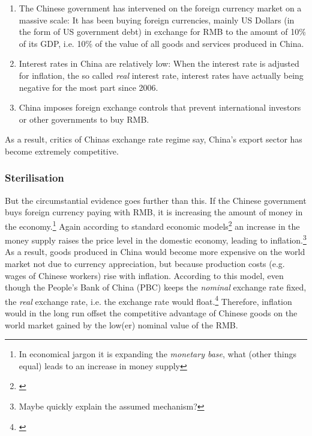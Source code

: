 \documentclass[11pt]{article}
\begin{document}
\begin{enumerate}
\item{The Chinese government has intervened on the foreign currency 
		market on a massive scale: It has been buying foreign 
		currencies, mainly US Dollars (in the form of US government 
		debt) in exchange for RMB to the amount of 10\% of its GDP, i.e. 
		10\% of the value of all goods and services produced in China.} 
\item{Interest rates in China are relatively low: When the interest rate is adjusted for inflation, the so called \emph{real} interest rate, interest rates have actually being negative for the most part since 2006.} %
\item{China imposes foreign exchange controls that prevent international investors or other governments to buy RMB.}%
\end{enumerate}

As a result, critics of Chinas exchange rate regime say, China's export sector has become extremely competitive. 


\subsubsection{Sterilisation}

But the circumstantial evidence goes further than this. If the Chinese government buys foreign currency paying with RMB, it is increasing the amount of money in the economy.\footnote{In economical jargon it is expanding the \emph{monetary base}, what (other things equal) leads to an increase in money supply} Again according to standard economic models\footnote{\cite[pp. ?]{Krugman2008}} an increase in the money supply raises the price level in the domestic economy, leading to inflation.\footnote{Maybe quickly explain the assumed mechanism?} As a result, goods produced in China would become more expensive on the world market not due to currency appreciation, but because production costs (e.g. wages of Chinese workers) rise with inflation. According to this model, even though the People's Bank of China (PBC) keeps the \emph{nominal} exchange rate fixed, the \emph{real} exchange rate, i.e. the exchange rate would float.\footnote{\cite[p. 509]{Krugman}} Therefore, inflation would in the long run offset the competitive advantage of Chinese goods on the world market gained by the low(er) nominal value of the RMB.
\end{document}
